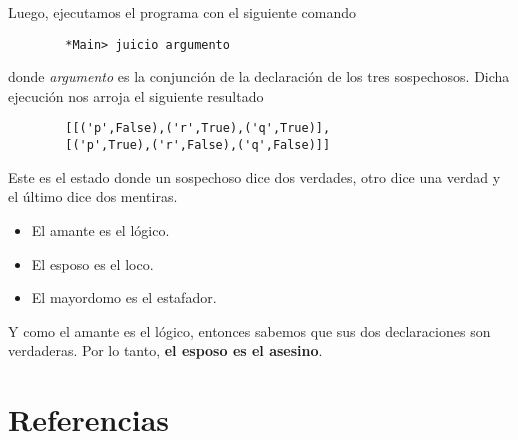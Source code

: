 \documentclass[letterpaper,11pt]{article}
\begin{document}
    Luego, ejecutamos el programa con el siguiente comando
    \begin{lstlisting}
        *Main> juicio argumento
    \end{lstlisting}

    donde \textit{argumento} es la conjunción de la declaración de los 
    tres sospechosos. Dicha ejecución nos arroja el siguiente resultado
    \begin{lstlisting}
        [[('p',False),('r',True),('q',True)],
        [('p',True),('r',False),('q',False)]]
    \end{lstlisting}

    Este es el estado donde un sospechoso dice dos verdades, otro dice una 
    verdad y el último dice dos mentiras. 
    \begin{itemize}
        \item El amante es el lógico.
        \item El esposo es el loco.
        \item El mayordomo es el estafador.
    \end{itemize}

    Y como el amante es el lógico, entonces sabemos que sus dos declaraciones
    son verdaderas. Por lo tanto, \textbf{el esposo es el asesino}.

    \section{Referencias}
    
\end{document}
